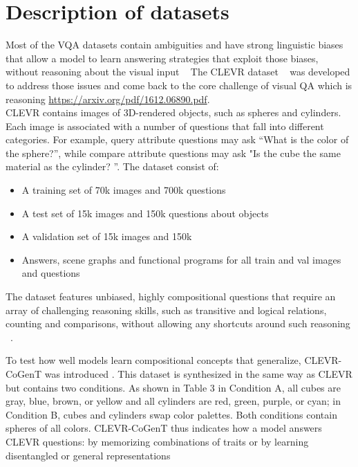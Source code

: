 \appendix

\section{Description of datasets}

Most of the VQA datasets contain ambiguities and have strong linguistic biases that allow a model to learn answering strategies that exploit those biases, without reasoning about the visual input ~\cite{Santoro2017ASN}
The CLEVR dataset ~\cite{johnson2017clevr}  was developed to address those issues and come back to the core challenge of visual QA which is reasoning  \href{url}{https://arxiv.org/pdf/1612.06890.pdf}.\\
CLEVR contains images of 3D-rendered objects, such as spheres and cylinders. Each image is associated with a number of questions that fall into different categories. For example, query attribute questions may ask “What is the color of the sphere?”, while compare attribute questions may ask "Is the cube the same material as the cylinder? ”.
The dataset consist of:
\begin{itemize}
\item 	A training set of 70k images and 700k questions
\item	A test  set of 15k images and 150k questions about objects
\item	A validation set of 15k images and 150k 
\item	Answers, scene graphs and functional programs for all train and val images and questions

\end{itemize}

The dataset features unbiased, highly compositional questions that require an array of challenging reasoning skills, such as transitive and logical relations, counting and comparisons, without allowing any shortcuts around such reasoning ~\cite{hudson2018compositional}.

To test how well models learn compositional concepts that generalize, CLEVR-CoGenT was introduced . This dataset is synthesized in the same way as CLEVR but contains two conditions. As shown in Table 3 in Condition A, all cubes are gray, blue, brown, or yellow and all cylinders are red, green, purple, or cyan; in Condition B, cubes and cylinders swap color palettes.
Both conditions contain spheres of all colors. CLEVR-CoGenT thus indicates how a model answers CLEVR questions: by memorizing combinations of traits or by learning disentangled or general representations ~\cite{perez2017film}


